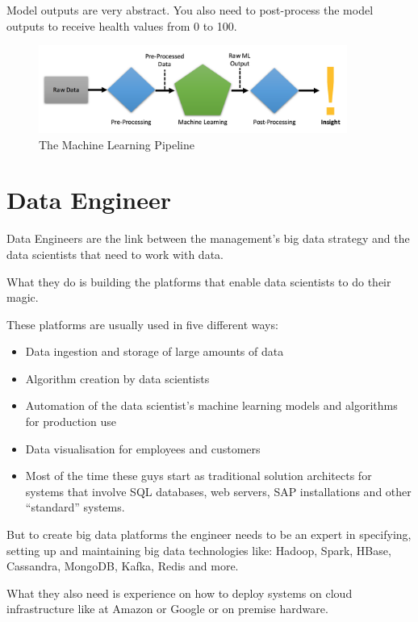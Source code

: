 \documentclass[12pt, numbers=noenddot]{scrreprt} %
\begin{document}
Model outputs are very abstract. You also need to post-process the model outputs to receive health values from 0 to 100.

\begin{figure}[htbp]
  \centering
     \includegraphics[width=0.9\textwidth]{images/Machine-Learning-Pipeline}
  \caption{The Machine Learning Pipeline}
  \label{fig:Bild1}
\end{figure}

\section{Data Engineer}
Data Engineers are the link between the management’s big data strategy and the data scientists that need to work with data.

What they do is building the platforms that enable data scientists to do their magic.

These platforms are usually used in five different ways:

\begin{itemize}
\item  Data ingestion and storage of large amounts of data
\item Algorithm creation by data scientists
\item Automation of the data scientist’s machine learning models and algorithms for production use
\item Data visualisation for employees and customers
\item  Most of the time these guys start as traditional solution architects for systems that involve SQL databases, web servers, SAP installations and other “standard” systems.
\end{itemize}

But to create big data platforms the engineer needs to be an expert in specifying, setting up and maintaining big data technologies like: Hadoop, Spark, HBase, Cassandra, MongoDB, Kafka, Redis and more.

What they also need is experience on how to deploy systems on cloud infrastructure like at Amazon or Google or on premise hardware.
\end{document}
